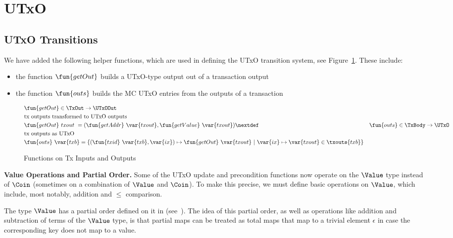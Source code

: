 \section{UTxO}
\label{sec:utxo}


\subsection{UTxO Transitions}
\label{sec:utxo-trans}

We have added the following helper functions, which are used in defining the
UTxO transition system, see Figure~\ref{fig:functions:insouts}. These include:

\begin{itemize}
  \item the function $\fun{getOut}$ builds a UTxO-type output out of a
  transaction output
  \item the function $\fun{outs}$ builds the MC UTxO entries from the outputs
  of a transaction
\end{itemize}

\begin{figure}[htb]
  \begin{align*}
    & \fun{getOut} \in \TxOut \to \UTxOOut \\
    & \text{tx outputs transformed to UTxO outputs} \\
    & \fun{getOut} ~{txout}~= (\fun{getAddr}~\var{txout}, \fun{getValue}~\var{txout})
    \nextdef
    & \fun{outs} \in \TxBody \to \UTxO \\
    & \text{tx outputs as UTxO} \\
    & \fun{outs} ~\var{txb} =
        \left\{
          (\fun{txid} ~ \var{txb}, \var{ix}) \mapsto \fun{getOut}~\var{txout} ~
          \middle|~
          \var{ix} \mapsto \var{txout} \in \txouts{txb}
        \right\} \\
  \end{align*}
  \caption{Functions on Tx Inputs and Outputs}
  \label{fig:functions:insouts}
\end{figure}

\textbf{Value Operations and Partial Order.}
Some of the UTxO update and precondition functions now operate on the $\Value$
type instead of $\Coin$ (sometimes on a combination of $\Value$ and $\Coin$).
To make this precise, we must define basic operations on $\Value$, which
include, most notably, addition and $\leq$ comparison.

The type $\Value$ has a partial order defined on it in (see~\cite{plutus_eutxo}).
The idea of this partial order, as well as operations like addition and subtraction
of terms of the $\Value$ type, is that partial maps can be treated as total maps
that map to a trivial element $\epsilon$ in case the corresponding key does not map to a
value.

